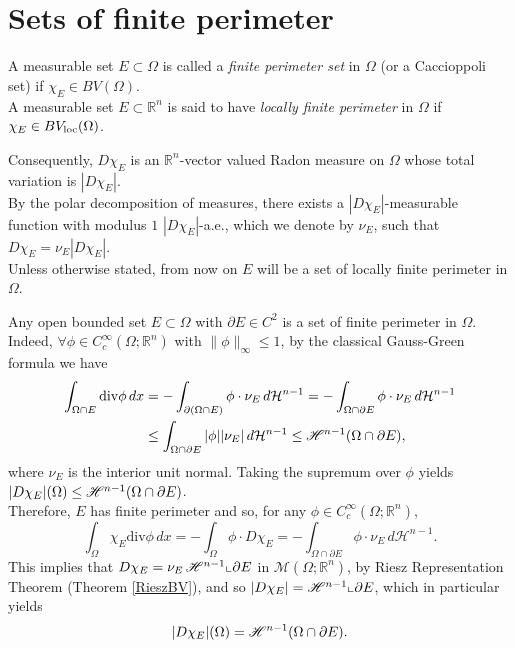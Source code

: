 \section{Sets of finite perimeter}

\begin{definition} A measurable set $E \subset \Omega$ is called a {\em finite perimeter set} in $\Omega$ (or a Caccioppoli set) if $\chi_{E} \in BV(\Omega)$.
\\
A measurable set $E \subset \mathbb{R}^{n}$ is said to have {\em locally finite perimeter} in $\Omega$ if $\chi_{E} \in BV_{\rm loc}(\Omega)$.
\end{definition}

Consequently, $D\chi_{E}$ is an $\mathbb{R}^{n}$-vector valued Radon measure on $\Omega$ whose total variation is $|D\chi_{E}|$.
\\
By the polar decomposition of measures, there exists a $|D\chi_{E}|$-measurable function with modulus $1$ $|D\chi_{E}|$-a.e., which we denote by $\nu_{E}$, such that $D\chi_{E} = \nu_{E} |D\chi_{E}|$.
\\
Unless otherwise stated, from now on $E$ will be a set of locally finite perimeter in $\Omega$.

\begin{example} Any open bounded set $E \subset \Omega$ with $\partial E \in C^{2}$ is a set of finite perimeter in $\Omega$.
\\ 
Indeed, $\forall \phi \in C_{c}^{\infty}(\Omega; \mathbb{R}^{n})$ with $\|\phi\|_{\infty} \le 1$, by the classical Gauss-Green formula we have
\begin{align*} \int_{\Omega \cap E} \mathrm{div} \phi \, dx & = - \int_{\partial(\Omega \cap E)} \phi \cdot \nu_{E} \, d\mathcal{H}^{n - 1}  = - \int_{\Omega \cap \partial E} \phi \cdot \nu_{E} \, d\mathcal{H}^{n - 1} \\
& \le \int_{\Omega \cap \partial E} |\phi| |\nu_{E}| \, d\mathcal{H}^{n - 1} \le \mathscr{H}^{n - 1}(\Omega \cap \partial E), 
\end{align*}
where $\nu_{E}$ is the interior unit normal. Taking the supremum over $\phi$ yields $|D \chi_{E}|(\Omega) \le \mathscr{H}^{n - 1}(\Omega \cap \partial E)$.
\\
Therefore, $E$ has finite perimeter and so, for any $\phi \in C^{\infty}_{c}(\Omega; \mathbb{R}^{n})$,
\[ \int_{\Omega} \chi_{E} \mathrm{div} \phi \, dx = - \int_{\Omega} \phi \cdot D \chi_{E} = - \int_{\Omega \cap \partial E} \phi \cdot \nu_{E} \, d\mathcal{H}^{n - 1}. \] 
This implies that $D \chi_{E} = \nu_{E} \, \mathscr{H}^{n - 1} \llcorner \partial E$ in $\mathcal{M}(\Omega; \mathbb{R}^{n})$, by Riesz Representation Theorem (Theorem \ref{RieszBV}), and so $|D \chi_{E}| = \mathscr{H}^{n - 1} \llcorner \partial E$, which in particular yields
\begin{equation} \label{Esmooth} |D \chi_{E}|(\Omega) = \mathscr{H}^{n - 1} (\Omega \cap \partial E). \end{equation}
\end{example}

